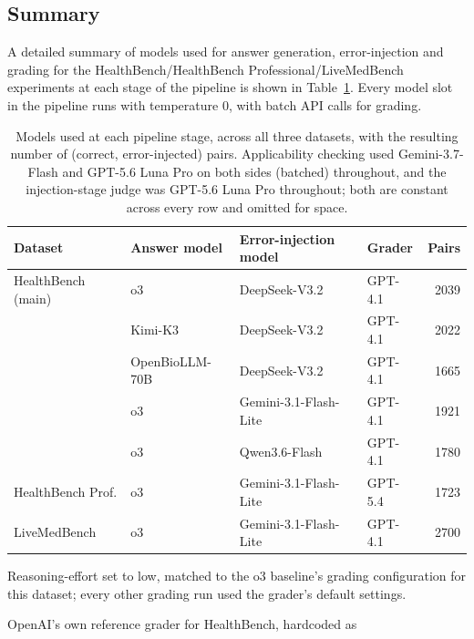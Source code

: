 \documentclass{article}
\begin{document}
\subsection*{Summary}
A detailed summary of models used for answer generation, error-injection and grading for the HealthBench/HealthBench Professional/LiveMedBench experiments at each stage of the pipeline is shown in Table~\ref{tab:model-summary}. Every model slot in the pipeline runs with temperature 0, with batch API calls for grading. 

\begin{table}[H]
\centering
\small
\caption{Models used at each pipeline stage, across all three datasets, with
the resulting number of (correct, error-injected) pairs. Applicability
checking used Gemini-3.7-Flash and GPT-5.6 Luna Pro on
both sides (batched) throughout, and the injection-stage judge was
GPT-5.6 Luna Pro throughout; both are
constant across every row and omitted for space.}
\label{tab:model-summary}
\begin{threeparttable}
\begin{tabular}{@{}llllr@{}}
\toprule
Dataset & Answer model & Error-injection model & Grader & Pairs \\
\midrule
HealthBench (main)   & o3             & DeepSeek-V3.2         & GPT-4.1\tnote{b} & 2039 \\
                     & Kimi-K3        & DeepSeek-V3.2         & GPT-4.1 & 2022 \\
                     & OpenBioLLM-70B & DeepSeek-V3.2         & GPT-4.1 & 1665 \\
                     & o3             & Gemini-3.1-Flash-Lite & GPT-4.1\tnote{d} & 1921 \\
                     & o3             & Qwen3.6-Flash         & GPT-4.1 & 1780 \\
\addlinespace
HealthBench Prof.    & o3             & Gemini-3.1-Flash-Lite & GPT-5.4\tnote{a,c} & 1723 \\
\addlinespace
LiveMedBench         & o3             & Gemini-3.1-Flash-Lite & GPT-4.1 & 2700 \\
\bottomrule
\end{tabular}
\begin{tablenotes}[flushleft]\footnotesize
\item[a] Reasoning-effort set to low, matched to the o3 baseline's grading
  configuration for this dataset; every other grading run used the grader's
  default settings.
\item[b] OpenAI's own reference grader for HealthBench, hardcoded as

\end{tablenotes}
\end{threeparttable}
\end{table}
\end{document}
